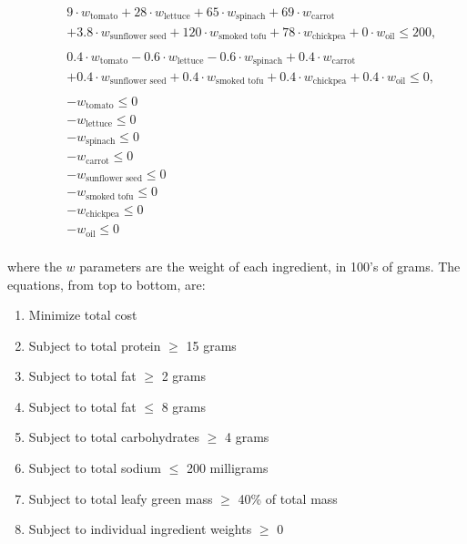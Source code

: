 \documentclass[../main.tex]{subfiles}
\begin{document}
\begin{enumerate}[i.]
\begin{equation*}
\begin{aligned}
			& & & 9 \cdot w_{\text{tomato}} + 28 \cdot  w_{\text{lettuce}} + 65 \cdot w_{\text{spinach}} + 69  \cdot w_{\text{carrot}} \\
			& & & + 3.8 \cdot w_{\text{sunflower seed}} + 120 \cdot w_{\text{smoked tofu}} + 78 \cdot w_{\text{chickpea}} + 0 \cdot w_{\text{oil}} \leq 200, \\ \\
			& & & 0.4 \cdot w_{\text{tomato}} - 0.6 \cdot  w_{\text{lettuce}} - 0.6 \cdot w_{\text{spinach}} + 0.4 \cdot w_{\text{carrot}} \\
			& & & + 0.4 \cdot w_{\text{sunflower seed}} + 0.4 \cdot w_{\text{smoked tofu}} + 0.4 \cdot w_{\text{chickpea}} + 0.4 \cdot w_{\text{oil}} \leq 0, \\ \\
			& & & - w_{\text{tomato}} \leq 0 \\
			& & & - w_{\text{lettuce}} \leq 0 \\
			& & & - w_{\text{spinach}} \leq 0 \\
			& & & - w_{\text{carrot}} \leq 0 \\
			& & & - w_{\text{sunflower seed}} \leq 0 \\
			& & & - w_{\text{smoked tofu}} \leq 0 \\
			& & & - w_{\text{chickpea}} \leq 0 \\
			& & & - w_{\text{oil}} \leq 0 \\
		\end{aligned}
	\end{equation*}

	where the $w$ parameters are the weight of each ingredient, in 100's of grams. The equations, from top to bottom, are:
	\begin{enumerate}[1)]
		\item Minimize total cost
		\item Subject to total protein $\geq$ 15 grams
		\item Subject to total fat $\geq$ 2 grams
		\item Subject to total fat $\leq$ 8 grams
		\item Subject to total carbohydrates $\geq$ 4 grams
		\item Subject to total sodium $\leq$ 200 milligrams
		\item Subject to total leafy green mass $\geq$ 40\% of total mass
		\item Subject to individual ingredient weights $\geq$ 0
	\end{enumerate}


\end{enumerate}
\end{document}
